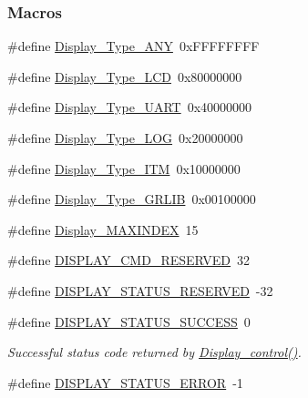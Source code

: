 \subsubsection*{Macros}
\begin{DoxyCompactItemize}
\item 
\#define \hyperlink{group___d_i_s_p_l_a_y___t_y_p_e_s_ga18e865923359fab7d26c09dc169caf37}{Display\+\_\+\+Type\+\_\+\+A\+N\+Y}~0x\+F\+F\+F\+F\+F\+F\+F\+F
\item 
\#define \hyperlink{group___d_i_s_p_l_a_y___t_y_p_e_s_ga9b8f62fe443d3a584f598392d233f38c}{Display\+\_\+\+Type\+\_\+\+L\+C\+D}~0x80000000
\item 
\#define \hyperlink{group___d_i_s_p_l_a_y___t_y_p_e_s_ga0257ac5b377a67eb525400e4c2a4f0d0}{Display\+\_\+\+Type\+\_\+\+U\+A\+R\+T}~0x40000000
\item 
\#define \hyperlink{group___d_i_s_p_l_a_y___t_y_p_e_s_gaaf8a10cc8b8de9d38f144d44f968b1fc}{Display\+\_\+\+Type\+\_\+\+L\+O\+G}~0x20000000
\item 
\#define \hyperlink{group___d_i_s_p_l_a_y___t_y_p_e_s_gae19f6c6b10d4e3d491819fb02ae4c865}{Display\+\_\+\+Type\+\_\+\+I\+T\+M}~0x10000000
\item 
\#define \hyperlink{group___d_i_s_p_l_a_y___t_y_p_e_s_ga498ae390d2feea643ec3f23533859f35}{Display\+\_\+\+Type\+\_\+\+G\+R\+L\+I\+B}~0x00100000
\item 
\#define \hyperlink{_display_8h_a61eb3c7b2406cb61825a0924b066d1ec}{Display\+\_\+\+M\+A\+X\+I\+N\+D\+E\+X}~15
\item 
\#define \hyperlink{group___d_i_s_p_l_a_y___c_o_n_t_r_o_l_ga99c2401cd11ea3b49e5e3e4ffac5c886}{D\+I\+S\+P\+L\+A\+Y\+\_\+\+C\+M\+D\+\_\+\+R\+E\+S\+E\+R\+V\+E\+D}~32
\item 
\#define \hyperlink{group___d_i_s_p_l_a_y___c_o_n_t_r_o_l_gacb7031dd18c19e3ecb86d97cb7b17abb}{D\+I\+S\+P\+L\+A\+Y\+\_\+\+S\+T\+A\+T\+U\+S\+\_\+\+R\+E\+S\+E\+R\+V\+E\+D}~-\/32
\item 
\#define \hyperlink{group___d_i_s_p_l_a_y___s_t_a_t_u_s_ga4f6a4a10f24cf55bc13d1750e38bb946}{D\+I\+S\+P\+L\+A\+Y\+\_\+\+S\+T\+A\+T\+U\+S\+\_\+\+S\+U\+C\+C\+E\+S\+S}~0
\begin{DoxyCompactList}\small\item\em Successful status code returned by \hyperlink{_display_8h_ad623d21e3c6d821bf6f4bdcfa05ec21f}{Display\+\_\+control()}. \end{DoxyCompactList}\item 
\#define \hyperlink{group___d_i_s_p_l_a_y___s_t_a_t_u_s_gaf91798b06dd95fce8063b7328420fab3}{D\+I\+S\+P\+L\+A\+Y\+\_\+\+S\+T\+A\+T\+U\+S\+\_\+\+E\+R\+R\+O\+R}~-\/1

\end{DoxyCompactItemize}
